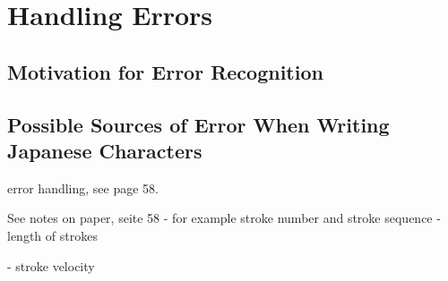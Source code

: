 \section{Handling Errors}
\label{sec:concept:handlingerrors}



\subsection{Motivation for Error Recognition}
\label{sec:concept:motivationforerrorrecognition}


\subsection[Sources of Error]{Possible Sources of Error When Writing Japanese Characters}
\label{sec:concept:sourcesoferror}

error handling, see page 58.


See notes on paper, seite 58
- for example stroke number and stroke sequence
- length of strokes

- stroke velocity